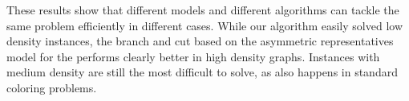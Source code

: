 \vskip 25pt

These results show that different models and different algorithms can tackle the same problem efficiently in different cases. While our algorithm easily solved low density instances, the branch and cut based on the asymmetric representatives model for the \PCP{} performs clearly better in high density graphs. Instances with medium density are still the most difficult to solve, as also happens in standard coloring problems.
